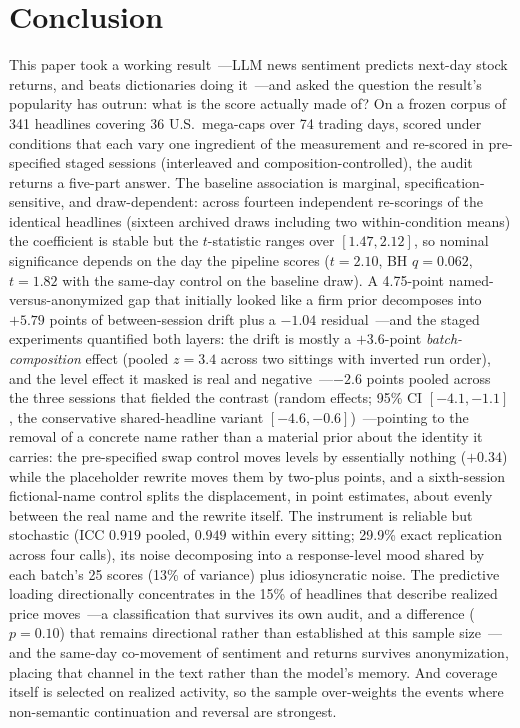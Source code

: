 \section{Conclusion}\label{sec:conclusion}

This paper took a working result~---LLM news sentiment predicts next-day stock returns, and beats dictionaries doing it~---and asked the question the result's popularity has outrun: what is the score actually made of? On a frozen corpus of 341 headlines covering 36 U.S.\ mega-caps over 74 trading days, scored under conditions that each vary one ingredient of the measurement and re-scored in pre-specified staged sessions (interleaved and composition-controlled), the audit returns a five-part answer. The baseline association is marginal, specification-sensitive, and draw-dependent: across fourteen independent re-scorings of the identical headlines (sixteen archived draws including two within-condition means) the coefficient is stable but the $t$-statistic ranges over $[1.47, 2.12]$, so nominal significance depends on the day the pipeline scores ($t=2.10$, BH $q=0.062$, $t=1.82$ with the same-day control on the baseline draw). A 4.75-point named-versus-anonymized gap that initially looked like a firm prior decomposes into $+5.79$ points of between-session drift plus a $-1.04$ residual~---and the staged experiments quantified both layers: the drift is mostly a $+3.6$-point \emph{batch-composition} effect (pooled $z=3.4$ across two sittings with inverted run order), and the level effect it masked is real and negative~---$-2.6$ points pooled across the three sessions that fielded the contrast (random effects; 95\% CI $[-4.1, -1.1]$, the conservative shared-headline variant $[-4.6, -0.6]$)~---pointing to the removal of a concrete name rather than a material prior about the identity it carries: the pre-specified swap control moves levels by essentially nothing ($+0.34$) while the placeholder rewrite moves them by two-plus points, and a sixth-session fictional-name control splits the displacement, in point estimates, about evenly between the real name and the rewrite itself. The instrument is reliable but stochastic (ICC $0.919$ pooled, $0.949$ within every sitting; 29.9\% exact replication across four calls), its noise decomposing into a response-level mood shared by each batch's 25 scores (13\% of variance) plus idiosyncratic noise. The predictive loading directionally concentrates in the 15\% of headlines that describe realized price moves~---a classification that survives its own audit, and a difference ($p=0.10$) that remains directional rather than established at this sample size~---and the same-day co-movement of sentiment and returns survives anonymization, placing that channel in the text rather than the model's memory. And coverage itself is selected on realized activity, so the sample over-weights the events where non-semantic continuation and reversal are strongest.

